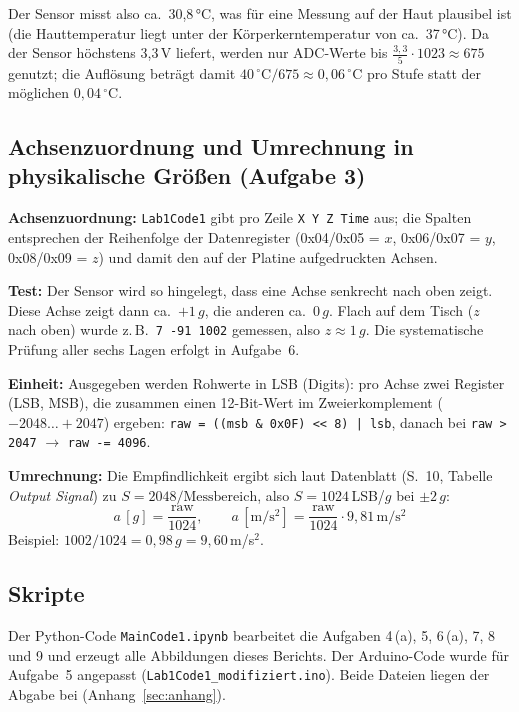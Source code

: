 \documentclass[a4paper,oneside,10pt]{article}
\begin{document}
Der Sensor misst also ca.\ 30{,}8\,°C, was für eine Messung auf der Haut plausibel
ist (die Hauttemperatur liegt unter der Körperkerntemperatur von ca.\ 37\,°C).
Da der Sensor höchstens 3{,}3\,V liefert, werden nur ADC-Werte bis
$\frac{3{,}3}{5}\cdot 1023 \approx 675$ genutzt; die Auflösung beträgt damit
$40\,^\circ\mathrm{C}/675 \approx 0{,}06\,^\circ$C pro Stufe statt der möglichen
$0{,}04\,^\circ$C.

\subsection{Achsenzuordnung und Umrechnung in physikalische Größen (Aufgabe 3)}

\textbf{Achsenzuordnung:} \texttt{Lab1Code1} gibt pro Zeile \texttt{X Y Z Time}
aus; die Spalten entsprechen der Reihenfolge der Datenregister (0x04/0x05 = $x$,
0x06/0x07 = $y$, 0x08/0x09 = $z$) und damit den auf der Platine aufgedruckten Achsen.

\textbf{Test:} Der Sensor wird so hingelegt, dass eine Achse senkrecht nach oben
zeigt. Diese Achse zeigt dann ca.\ $+1\,g$, die anderen ca.\ $0\,g$. Flach auf dem
Tisch ($z$ nach oben) wurde z.\,B.\ \texttt{7 -91 1002} gemessen, also $z \approx 1\,g$.
Die systematische Prüfung aller sechs Lagen erfolgt in Aufgabe~6.

\textbf{Einheit:} Ausgegeben werden Rohwerte in LSB (Digits): pro Achse zwei
Register (LSB, MSB), die zusammen einen 12-Bit-Wert im Zweierkomplement
($-2048 \ldots +2047$) ergeben:
\texttt{raw = ((msb \& 0x0F) << 8) | lsb}, danach bei \texttt{raw > 2047}
$\rightarrow$ \texttt{raw -= 4096}.

\textbf{Umrechnung:} Die Empfindlichkeit ergibt sich laut Datenblatt \cite{bma400} (S.~10, Tabelle \emph{Output Signal}) zu
$S = 2048/\text{Messbereich}$, also $S = 1024$\,LSB/$g$ bei $\pm 2\,g$:
\begin{equation}
  a\,[g] = \frac{\text{raw}}{1024}, \qquad
  a\,[\mathrm{m/s^2}] = \frac{\text{raw}}{1024}\cdot 9{,}81\,\mathrm{m/s^2}
\end{equation}
Beispiel: $1002/1024 = 0{,}98\,g = 9{,}60$\,m/s$^2$.

\subsection{Skripte}

Der Python-Code \texttt{MainCode1.ipynb} bearbeitet die Aufgaben 4\,(a), 5,
6\,(a), 7, 8 und 9 und erzeugt alle Abbildungen dieses Berichts. Der Arduino-Code
wurde für Aufgabe~5 angepasst (\texttt{Lab1Code1\_modifiziert.ino}). Beide Dateien
liegen der Abgabe bei (Anhang~\ref{sec:anhang}).
\end{document}
